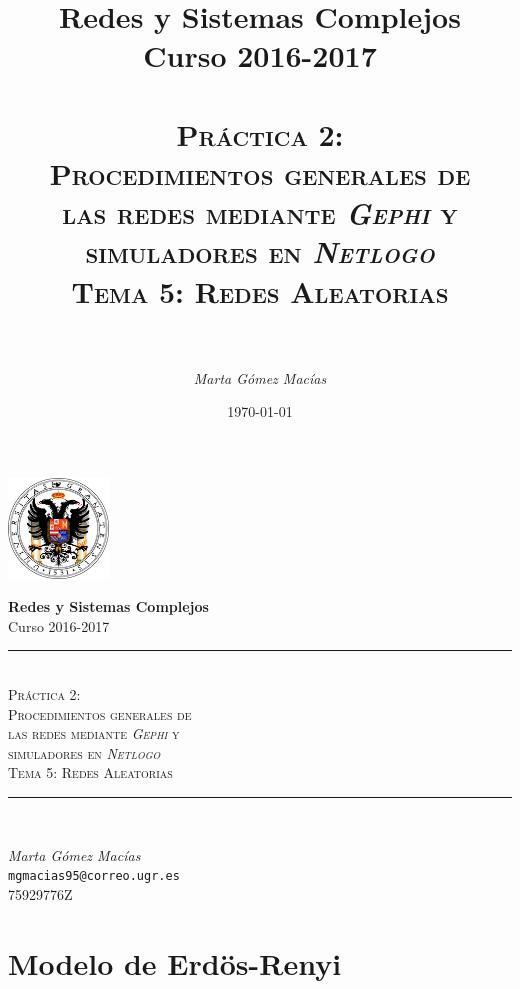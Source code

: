 \documentclass[10pt,a4paper,spanish]{article}
\title{
\normalfont \normalsize 
{\bf Redes y Sistemas Complejos} \\ Curso 2016-2017 \\ [25pt] %
\horrule{0.5pt} \\[0.4cm] %
\huge \textsc{Práctica 2: \\ Procedimientos generales de \\ las redes mediante \textit{Gephi} y \\ simuladores en \textit{Netlogo} \\ Tema 5: Redes Aleatorias} \\ %
\horrule{2pt} \\[0.5cm] %
}
\author{\textit{Marta Gómez Macías}} %
\numberwithin{equation}{section} %
\numberwithin{figure}{section} %
\numberwithin{table}{section} %
\theoremstyle{plain}
\theoremstyle{definition}
\newcommand{\horrule}[1]{\rule{\linewidth}{#1}} %
\begin{document}
\renewcommand{\listtablename}{Índice de tablas}
\renewcommand{\tablename}{Tabla}

\begin{titlepage}
\begin{center}
\includegraphics[width=0.2\textwidth]{../../../ugr}

\normalfont \normalsize 
{\bf Redes y Sistemas Complejos} \\ Curso 2016-2017 \\ [25pt] %
\horrule{0.5pt} \\[0.4cm] %
{\huge \textsc{Práctica 2: \\ Procedimientos generales de \\ las redes mediante \textit{Gephi} y \\ simuladores en \textit{Netlogo} \\[0.5cm] Tema 5: Redes Aleatorias}} %
\horrule{2pt} \\[0.8cm] %

{\Large \textit{Marta Gómez Macías} \\ \texttt{mgmacias95@correo.ugr.es} \\ 75929776Z \\[0.5cm]

\date{\today}} %
\end{center}
\end{titlepage}

\tableofcontents %

\section{Modelo de Erdös-Renyi}
\end{document}
